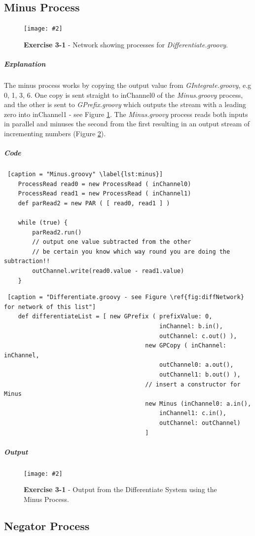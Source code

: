 \documentclass[10pt, a4paper]{article}
\newcommand{\figuremacro}[5]{
    \begin{figure}[#1]
        \centering
        \texttt{[image: \#2]}
        \caption[#3]{\textbf{#3}#4}
        \label{fig:#2}
    \end{figure}
}
\begin{document}
	\subsection*{Minus Process} \hfill
	
	\figuremacro{H}{diffNetwork}{Exercise 3-1}{ - Network showing processes for \textit{Differentiate.groovy}.}{1.0}
	
	\subparagraph{Explanation} The minus process works by copying the output value from \textit{GIntegrate.groovy}, e.g 0, 1, 3, 6. One copy is sent straight to inChannel0 of the \textit{Minus.groovy} process, and the other is sent to \textit{GPrefix.groovy} which outputs the stream with a leading zero into inChannel1 - see Figure \ref{fig:diffNetwork}. The \textit{Minus.groovy} process reads both inputs in parallel and minuses the second from the first resulting in an output stream of incrementing numbers (Figure \ref{fig:output3-1minus}).
	
	\subparagraph{Code} \hfill
	
	\begin{lstlisting} [caption = "Minus.groovy" \label{lst:minus}]
    ProcessRead read0 = new ProcessRead ( inChannel0)
	ProcessRead read1 = new ProcessRead ( inChannel1)
	def parRead2 = new PAR ( [ read0, read1 ] )
		
	while (true) {
		parRead2.run()
		// output one value subtracted from the other
		// be certain you know which way round you are doing the subtraction!!
		outChannel.write(read0.value - read1.value)
	} \end{lstlisting}
	
	\begin{lstlisting} [caption = "Differentiate.groovy - see Figure \ref{fig:diffNetwork} for network of this list"]
	def differentiateList = [ new GPrefix ( prefixValue: 0, 
											inChannel: b.in(), 
											outChannel: c.out() ),
										new GPCopy ( inChannel: inChannel,  
											outChannel0: a.out(), 
											outChannel1: b.out() ),
										// insert a constructor for Minus    
										new Minus (inChannel0: a.in(),
											inChannel1: c.in(),
											outChannel: outChannel)
										] \end{lstlisting}
	
	\subparagraph{Output} \hfill
	
	\figuremacro{H}{output3-1minus}{Exercise 3-1}{ - Output from the Differentiate System using the Minus Process.}{0.2}
	
	\subsection*{Negator Process}
	
\end{document}
